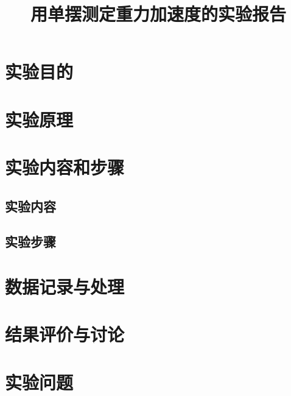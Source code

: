 \documentclass{lzureport}
\title{用单摆测定重力加速度的实验报告}  %
\date{\zhtoday} %
\begin{document}
\makeheader %


\section{实验目的}

\section{实验原理}

\section{实验内容和步骤}

  \subsection{实验内容}

  \subsection{实验步骤}

\section{数据记录与处理}

\section{结果评价与讨论}

\section{实验问题}
\end{document}
